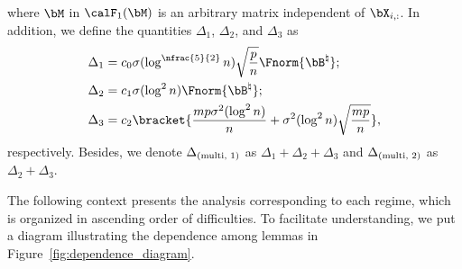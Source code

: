 \documentclass[11pt]{article}
\def \bBtrue {\bB^{\natural}}
\begin{document}
where $\bM$ in $\calF_1(\bM)$ is an arbitrary matrix independent of $\bX_{i, :}$.
In addition, we define the quantities $\Delta_1$,
$\Delta_2$, and $\Delta_3$ as
\begin{align}
\Delta_1 &=
c_0 \sigma(\log^{\nfrac{5}{2}} n)\sqrt{\frac{p}{n}}\Fnorm{\bBtrue}; \label{eq:Delta1_def}\\
\Delta_2 &= c_1\sigma (\log^2 n)\Fnorm{\bBtrue};\label{eq:Delta2_def} \\
\Delta_3 &= c_2\bracket{\frac{mp\sigma^2 (\log^2 n)}{n}
+ \sigma^2(\log^2 n)\sqrt{\frac{mp}{n}}}, \label{eq:Delta3_def}
\end{align}
respectively. Besides, we denote $\Delta_{(\textup{multi, 1})}$ as
$\Delta_1 + \Delta_2 + \Delta_3$ and
$\Delta_{(\textup{multi, 2})}$ as $\Delta_2 + \Delta_3$.

The following context presents the analysis corresponding to each regime, which is organized in
ascending order
of difficulties. To facilitate understanding, we put a diagram illustrating the dependence among lemmas in
Figure~\ref{fig:dependence_diagram}.

\vspace{0.1in}
\end{document}

